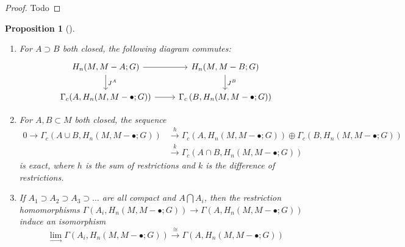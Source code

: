 \documentclass[reqno]{amsart}
\newtheorem{proposition}[theorem]{Proposition}
\theoremstyle{definition}
\theoremstyle{remark}
\begin{document}
\begin{proof}
    Todo
\end{proof}

\begin{proposition}[]
    \begin{enumerate}
        \item 
    For $A \supset B$ both closed, the following
    diagram commutes:
    \begin{equation*}
    \begin{tikzcd}
        H_n(M, M - A;G) \ar[r] \ar[d, "J^{A}"] &
        H_n(M, M - B ; G) \ar[d, "J^{B}"] \\
        \Gamma_c (A,
        H_n(M, M - \bullet ; G)) \ar[r] & 
        \Gamma_c \left( B,
        H_n(M, M - \bullet; G) \right) 
    \end{tikzcd}
    \end{equation*}
\item  For $A , B \subset M$ both closed, the sequence
        \begin{align*}
    0 \to \Gamma_c (A \cup B, 
    H_n(M, M - \bullet;G)) 
    &\stackrel{h}{\to} 
    \Gamma_c \left( A, H_n(M, M - \bullet;G) \right) 
    \oplus \Gamma_c \left( 
    B, H_n(M, M - \bullet; G) \right)\\
    &\stackrel{k}{\to} 
    \Gamma_c \left( A \cap B,
    H_n\left( M, M-\bullet; G \right) \right) 
        \end{align*}
    is exact, where $h$ is the sum of restrictions and
    $k$ is the difference of restrictions.
\item If $A_1 \supset A_2 \supset A_3 \supset \ldots$ are
    all compact and $A \bigcap A_i  $, then the restriction
    homomorphisms
    $\Gamma \left( A_i, H_n \left( M, M - \bullet; G \right)  \right) 
    \to \Gamma \left( A, H_n \left( M, M- \bullet; G \right) 
    \right) $ induce an isomorphism
    \[
    \lim_{\rightarrow} \Gamma
    \left( A_i, H_n\left( M, M - \bullet;G \right)  \right) 
    \stackrel{\cong}{\to} 
    \Gamma \left( A, H_n (M, M- \bullet;G) \right) 
    \] 
    \end{enumerate}
\end{proposition}
\end{document}
